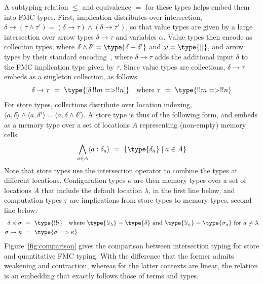 \documentclass[a4paper,UKenglish,cleveref, autoref, thm-restate]{lipics-v2021}
\begin{document}
A subtyping relation $\leq$ and equivalence $=$ for these types helps embed them into FMC types. First, implication distributes over intersection, $\delta\to(\tau\wedge\tau')=(\delta\to\tau)\wedge(\delta\to\tau')$, so that value types are given by a large intersection over arrow types $\delta\to\tau$ and variables $\alpha$. Value types then encode as collection types, where $\delta\wedge\delta'=\type{\delta + \delta'}$ and $\omega=\type{[]}$, and arrow types by their standard encoding~\cite{Heijltjes-2022}, where $\delta\to\tau$ adds the additional input $\delta$ to the FMC implication type given by $\tau$. Since value types are collections, $\delta\to\tau$ embeds as a singleton collection, as follows.
\[
	\delta\to\tau~=~\type{[\delta\,!!m => !!n]} \quad \text{where~}\tau~=~\type{!!m=> !!n}	
\]
For store types, collections distribute over location indexing, $\langle a,\delta\rangle\wedge\langle a,\delta'\rangle=\langle a,\delta\wedge\delta'\rangle$. A store type is thus of the following form, and embeds as a memory type over a set of locations $A$ representing (non-empty) memory cells.
\[
	\bigwedge_{a\in A}\langle a:\delta_a\rangle~=~\{\type{\delta_a}\mid a\in A\}
\]
Note that store types use the intersection operator to combine the types at different locations. Configuration types $\kappa$ are then memory types over a set of locations $A$ that include the default location $\lambda$, in the first line below, and computation types $\tau$ are implications from store types to memory types, second line below.
\[
\begin{aligned}
	\delta\times\sigma &~=~\type{!!i}\quad\text{where}~\type{!i_\lambda}=\type{\delta}~\text{and}~\type{!i_a}=\type{\sigma_a}~\text{for}~a\neq\lambda
\\	   \sigma\to\kappa &~=~\type{\sigma=>\kappa}
\end{aligned}
\]
Figure~\ref{fig:comparison} gives the comparison between intersection typing for store and quantitative FMC typing. With the difference that the former admits weakening and contraction, whereas for the latter contexts are linear, the relation is an embedding that exactly follows those of terms and types.
\end{document}
